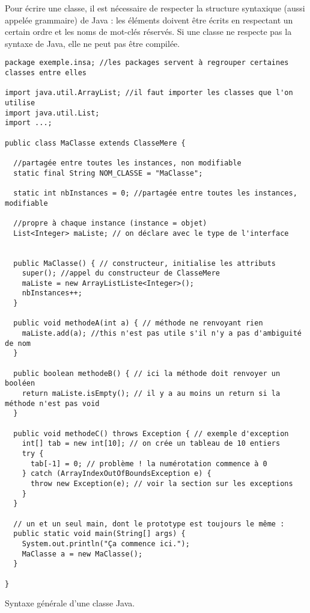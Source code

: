 \documentclass[10pt]{article}
\begin{document}
Pour écrire une classe, il est nécessaire de respecter la structure syntaxique (aussi appelée grammaire)
de Java : les éléments doivent être écrits en respectant un certain ordre et les noms
de mot-clés réservés. Si une classe ne respecte pas la syntaxe de Java, elle ne peut pas être compilée.


\begin{listing}[h!]
\begin{verbatim}
package exemple.insa; //les packages servent à regrouper certaines classes entre elles

import java.util.ArrayList; //il faut importer les classes que l'on utilise
import java.util.List;
import ...;

public class MaClasse extends ClasseMere {

  //partagée entre toutes les instances, non modifiable
  static final String NOM_CLASSE = "MaClasse"; 

  static int nbInstances = 0; //partagée entre toutes les instances, modifiable

  //propre à chaque instance (instance = objet) 
  List<Integer> maListe; // on déclare avec le type de l'interface


  public MaClasse() { // constructeur, initialise les attributs
    super(); //appel du constructeur de ClasseMere
    maListe = new ArrayListListe<Integer>();
    nbInstances++;
  }

  public void methodeA(int a) { // méthode ne renvoyant rien
    maListe.add(a); //this n'est pas utile s'il n'y a pas d'ambiguité de nom
  }

  public boolean methodeB() { // ici la méthode doit renvoyer un booléen
    return maListe.isEmpty(); // il y a au moins un return si la méthode n'est pas void
  }

  public void methodeC() throws Exception { // exemple d'exception
    int[] tab = new int[10]; // on crée un tableau de 10 entiers
    try {
      tab[-1] = 0; // problème ! la numérotation commence à 0
    } catch (ArrayIndexOutOfBoundsException e) {
      throw new Exception(e); // voir la section sur les exceptions
    }
  }

  // un et un seul main, dont le prototype est toujours le même :
  public static void main(String[] args) {
    System.out.println("Ça commence ici.");
    MaClasse a = new MaClasse();
  }
  
}

\end{verbatim}
\caption{Syntaxe générale d'une classe Java.
\label{lst.syntax}}
\end{listing}
\end{document}
